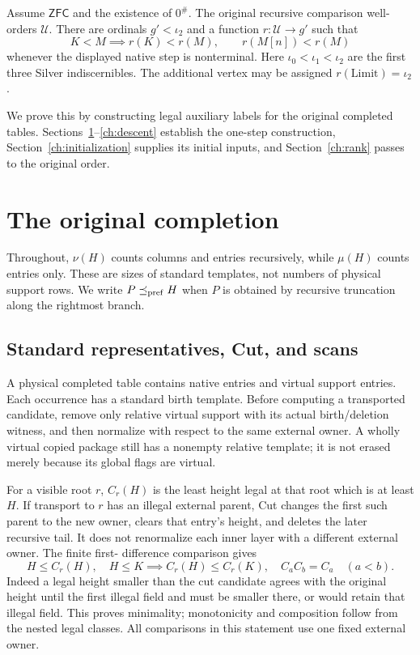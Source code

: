 \begin{theorem}\label{thm:main}
Assume $\mathsf{ZFC}$ and the existence of $0^\#$. The original recursive
comparison well-orders $\mathscr U$. There are ordinals $g'<\iota_2$ and
a function $r:\mathscr U\to g'$ such that
\[
 K<M\implies r(K)<r(M),\qquad r(M[n])<r(M)
\]
whenever the displayed native step is nonterminal. Here
$\iota_0<\iota_1<\iota_2$ are the first three Silver indiscernibles.
The additional vertex may be assigned $r(\mathrm{Limit})=\iota_2$.
\end{theorem}

We prove this by constructing legal auxiliary labels for the original
completed tables. Sections~\ref{ch:completion}--\ref{ch:descent} establish
the one-step construction, Section~\ref{ch:initialization} supplies its
initial inputs, and Section~\ref{ch:rank} passes to the original order.

\section{The original completion}\label{ch:completion}
Throughout, $\nu(H)$ counts columns and entries recursively, while
$\mu(H)$ counts entries only. These are sizes of standard templates,
not numbers of physical support rows. We write $P\preceq_{\mathrm{pref}} H$ when $P$
is obtained by recursive truncation along the rightmost branch.


\subsection{Standard representatives, Cut, and scans}
A physical completed table contains native entries and virtual support
entries. Each occurrence has a standard birth template. Before computing
a transported candidate, remove only relative virtual support with its
actual birth/deletion witness, and then normalize with respect to the
same external owner. A wholly virtual copied package still has a
nonempty relative template; it is not erased merely because its global
flags are virtual.

For a visible root $r$, $C_r(H)$ is the least height legal at that root
which is at least $H$. If transport to $r$ has an illegal external parent,
Cut changes the first such parent to the new owner, clears that entry's
height, and deletes the later recursive tail. It does not renormalize
each inner layer with a different external owner. The finite first-
difference comparison gives
\[
 H\le C_r(H),\quad H\le K\implies C_r(H)\le C_r(K),\quad
 C_a C_b=C_a\quad(a<b).
\]
Indeed a legal height smaller than the cut candidate agrees with the
original height until the first illegal field and must be smaller there,
or would retain that illegal field. This proves minimality; monotonicity
and composition follow from the nested legal classes.
All comparisons in this statement use one fixed external owner.


